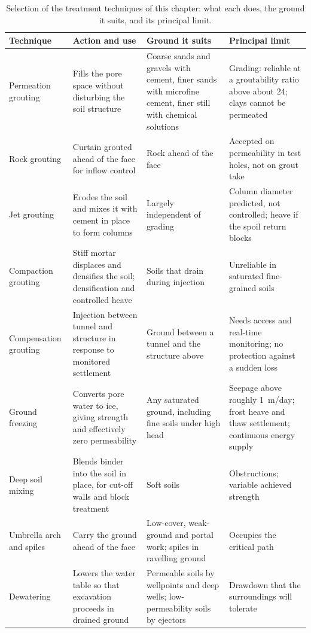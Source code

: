 \begin{table}[htbp]
\caption{Selection of the treatment techniques of this chapter: what each does, the ground it suits, and its principal limit.}
\label{tab:technique-selection}
\centering
\small
\begin{tabularx}{\textwidth}{@{}>{\RaggedRight\arraybackslash}p{} Y Y Y@{}}
\toprule
\textbf{Technique} & \textbf{Action and use} & \textbf{Ground it suits} & \textbf{Principal limit} \\
\midrule
Permeation grouting & Fills the pore space without disturbing the soil structure & Coarse sands and gravels with cement, finer sands with microfine cement, finer still with chemical solutions & Grading: reliable at a groutability ratio above about 24; clays cannot be permeated \\
Rock grouting & Curtain grouted ahead of the face for inflow control & Rock ahead of the face & Accepted on permeability in test holes, not on grout take \\
Jet grouting & Erodes the soil and mixes it with cement in place to form columns & Largely independent of grading & Column diameter predicted, not controlled; heave if the spoil return blocks \\
Compaction grouting & Stiff mortar displaces and densifies the soil; densification and controlled heave & Soils that drain during injection & Unreliable in saturated fine-grained soils \\
Compensation grouting & Injection between tunnel and structure in response to monitored settlement & Ground between a tunnel and the structure above & Needs access and real-time monitoring; no protection against a sudden loss \\
Ground freezing & Converts pore water to ice, giving strength and effectively zero permeability & Any saturated ground, including fine soils under high head & Seepage above roughly 1~m/day; frost heave and thaw settlement; continuous energy supply \\
Deep soil mixing & Blends binder into the soil in place, for cut-off walls and block treatment & Soft soils & Obstructions; variable achieved strength \\
Umbrella arch and spiles & Carry the ground ahead of the face & Low-cover, weak-ground and portal work; spiles in ravelling ground & Occupies the critical path \\
Dewatering & Lowers the water table so that excavation proceeds in drained ground & Permeable soils by wellpoints and deep wells; low-permeability soils by ejectors & Drawdown that the surroundings will tolerate \\
\bottomrule
\end{tabularx}
\end{table}

